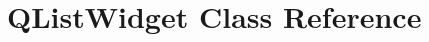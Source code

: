 \hypertarget{classGUI_1_1QtGui_1_1QListWidget}{}\section{Q\+List\+Widget Class Reference}
\label{classGUI_1_1QtGui_1_1QListWidget}
